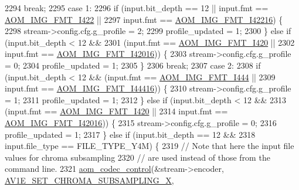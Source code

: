 \begin{DoxyCodeInclude}
{{{{{{{{{{{{{{{{{{{{{{{{{{{{{{{{{{{{{{{{{{{{{{{{{{{{{{{{{{{{{{2294           \textcolor{keywordflow}{break};
2295         \textcolor{keywordflow}{case} 1:
2296           \textcolor{keywordflow}{if} (input.bit\_depth == 12 || input.fmt == \hyperlink{aom__image_8h_a930317c04b4bd0a660bb5e744055523cab2f75281e94ebc0f0bc728ef287cd3e8}{AOM\_IMG\_FMT\_I422} ||
2297               input.fmt == \hyperlink{aom__image_8h_a930317c04b4bd0a660bb5e744055523ca064683ed4260fc6244af6cfc9d261c22}{AOM\_IMG\_FMT\_I42216}) \{
2298             stream->config.cfg.g\_profile = 2;
2299             profile\_updated = 1;
2300           \} \textcolor{keywordflow}{else} \textcolor{keywordflow}{if} (input.bit\_depth < 12 &&
2301               (input.fmt == \hyperlink{aom__image_8h_a930317c04b4bd0a660bb5e744055523cabd778a3d697463e89d12a1117f417b60}{AOM\_IMG\_FMT\_I420} ||
2302                   input.fmt == \hyperlink{aom__image_8h_a930317c04b4bd0a660bb5e744055523ca20a9cf30277260685642b4cfb4e9273b}{AOM\_IMG\_FMT\_I42016})) \{
2303             stream->config.cfg.g\_profile = 0;
2304             profile\_updated = 1;
2305           \}
2306           \textcolor{keywordflow}{break};
2307         \textcolor{keywordflow}{case} 2:
2308           \textcolor{keywordflow}{if} (input.bit\_depth < 12 && (input.fmt == \hyperlink{aom__image_8h_a930317c04b4bd0a660bb5e744055523ca89d423506e948ab7d3b98b5750b92655}{AOM\_IMG\_FMT\_I444} ||
2309               input.fmt == \hyperlink{aom__image_8h_a930317c04b4bd0a660bb5e744055523cab9b93d397dedbdd6bfafec84d1f8f0f5}{AOM\_IMG\_FMT\_I44416})) \{
2310             stream->config.cfg.g\_profile = 1;
2311             profile\_updated = 1;
2312           \} \textcolor{keywordflow}{else} \textcolor{keywordflow}{if} (input.bit\_depth < 12 &&
2313               (input.fmt == \hyperlink{aom__image_8h_a930317c04b4bd0a660bb5e744055523cabd778a3d697463e89d12a1117f417b60}{AOM\_IMG\_FMT\_I420} ||
2314                   input.fmt == \hyperlink{aom__image_8h_a930317c04b4bd0a660bb5e744055523ca20a9cf30277260685642b4cfb4e9273b}{AOM\_IMG\_FMT\_I42016})) \{
2315             stream->config.cfg.g\_profile = 0;
2316             profile\_updated = 1;
2317           \} \textcolor{keywordflow}{else} \textcolor{keywordflow}{if} (input.bit\_depth == 12 &&
2318               input.file\_type == FILE\_TYPE\_Y4M) \{
2319             \textcolor{comment}{// Note that here the input file values for chroma subsampling}
2320             \textcolor{comment}{// are used instead of those from the command line.}
2321             \hyperlink{group__codec_ga6da974f4eeaba1fa74106b28d0fe6ac5}{aom\_codec\_control}(&stream->encoder, 
      \hyperlink{group__aom__encoder_ggae78dde67a6d78f332e9bdba0dde42db5a283dd3f4387e5f3a754fea0d206b1cb0}{AV1E\_SET\_CHROMA\_SUBSAMPLING\_X},
}}}}}}}}}}}}}}}}}}}}}}}}}}}}}}}}}}}}}}}}}}}}}}}}}}}}}}}}}}}}}}
\end{DoxyCodeInclude}
